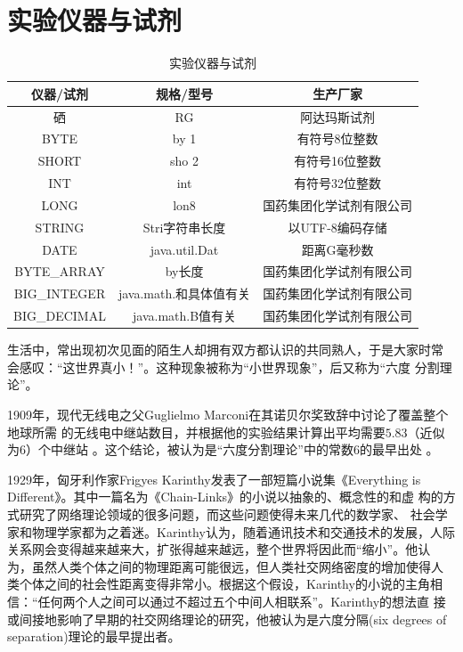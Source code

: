 \documentclass[bachelor,winfonts]{jnuthesis}
\begin{document}
    \section{实验仪器与试剂}
        \begin{table}
        \centering
        \begin{tabular}{ccc}
            \toprule
            \textbf{仪器/试剂} & \textbf{规格/型号} & \textbf{生产厂家} \\
            \midrule
            硒   &  RG  & 阿达玛斯试剂 \\
            BYTE     & by  1  & 有符号8位整数 \\
            SHORT    & sho  2  & 有符号16位整数 \\
            INT      & int       & 有符号32位整数 \\
            LONG     & lon8  & 国药集团化学试剂有限公司 \\
            STRING   & Stri字符串长度  & 以UTF-8编码存储 \\
            DATE     & java.util.Dat & 距离G毫秒数 \\
            BYTE\_ARRAY & by长度 & 国药集团化学试剂有限公司 \\
            BIG\_INTEGER & java.math.和具体值有关 & 国药集团化学试剂有限公司 \\
            BIG\_DECIMAL & java.math.B值有关 & 国药集团化学试剂有限公司 \\
            \bottomrule
        \end{tabular}
        \caption{实验仪器与试剂}\label{table:实验仪器与试剂}
    \end{table}
    生活中，常出现初次见面的陌生人却拥有双方都认识的共同熟人，于是大家时常
    会感叹：“这世界真小！”。这种现象被称为``小世界现象''，后又称为``六度
    分割理论''。
    

    
    1909年，现代无线电之父Guglielmo Marconi在其诺贝尔奖致辞中讨论了覆盖整个地球所需
    的无线电中继站数目，并根据他的实验结果计算出平均需要$5.83$（近似为$6$）个中继站
    \cite{marconi1909nobel}。这个结论，被认为是``六度分割理论''中的常数$6$的最早出处
    \cite{barabasi2003linked}。
    
    1929年，匈牙利作家Frigyes Karinthy发表了一部短篇小说集《Everything is
    Different》。其中一篇名为《Chain-Links》的小说以抽象的、概念性的和虚
    构的方式研究了网络理论领域的很多问题，而这些问题使得未来几代的数学家、
    社会学家和物理学家都为之着迷\cite{newman2006structure,
        barabasi2003linked}。Karinthy认为，随着通讯技术和交通技术的发展，人际
    关系网会变得越来越来大，扩张得越来越远，整个世界将因此而``缩小''。他认
    为，虽然人类个体之间的物理距离可能很远，但人类社交网络密度的增加使得人
    类个体之间的社会性距离变得非常小。根据这个假设，Karinthy的小说的主角相
    信：``任何两个人之间可以通过不超过五个中间人相联系''。Karinthy的想法直
    接或间接地影响了早期的社交网络理论的研究，他被认为是六度分隔(six
    degrees of separation)理论的最早提出者\cite{barabasi2003linked}。
    
\end{document}
